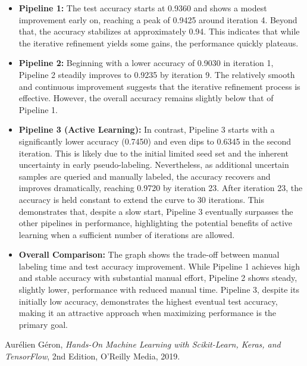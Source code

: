 \documentclass[12pt]{article}
\begin{document}
\begin{itemize}
    \item \textbf{Pipeline 1:}  
    The test accuracy starts at 0.9360 and shows a modest improvement early on, reaching a peak of 0.9425 around iteration 4. Beyond that, the accuracy stabilizes at approximately 0.94. This indicates that while the iterative refinement yields some gains, the performance quickly plateaus.

    \item \textbf{Pipeline 2:}  
    Beginning with a lower accuracy of 0.9030 in iteration 1, Pipeline 2 steadily improves to 0.9235 by iteration 9. The relatively smooth and continuous improvement suggests that the iterative refinement process is effective. However, the overall accuracy remains slightly below that of Pipeline 1.

    \item \textbf{Pipeline 3 (Active Learning):}  
    In contrast, Pipeline 3 starts with a significantly lower accuracy (0.7450) and even dips to 0.6345 in the second iteration. This is likely due to the initial limited seed set and the inherent uncertainty in early pseudo-labeling. Nevertheless, as additional uncertain samples are queried and manually labeled, the accuracy recovers and improves dramatically, reaching 0.9720 by iteration 23. After iteration 23, the accuracy is held constant to extend the curve to 30 iterations. This demonstrates that, despite a slow start, Pipeline 3 eventually surpasses the other pipelines in performance, highlighting the potential benefits of active learning when a sufficient number of iterations are allowed.

    \item \textbf{Overall Comparison:}  
 The graph shows the trade-off between manual labeling time and test accuracy improvement. While Pipeline 1 achieves high and stable accuracy with substantial manual effort, Pipeline 2 shows steady, slightly lower, performance with reduced manual time. Pipeline 3, despite its initially low accuracy, demonstrates the highest eventual test accuracy, making it an attractive approach when maximizing performance is the primary goal.
\end{itemize}


\begin{thebibliography}{9}
Aurélien Géron, \emph{Hands-On Machine Learning with Scikit-Learn, Keras, and TensorFlow}, 2nd Edition, O'Reilly Media, 2019.
\end{thebibliography}
\end{document}
